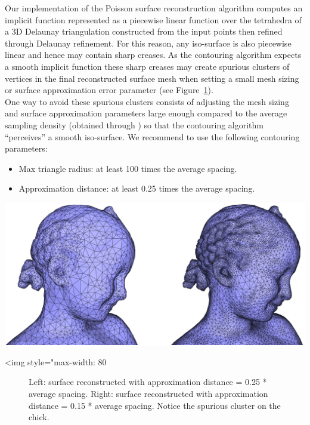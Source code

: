 Our implementation of the Poisson surface reconstruction algorithm computes an implicit function represented as a piecewise linear function over the tetrahedra of a 3D Delaunay triangulation constructed from the input points then refined through Delaunay refinement. For this reason, any iso-surface is also piecewise linear and hence may contain sharp creases. As the contouring algorithm  expects a smooth implicit function these sharp creases may create spurious clusters of vertices in the final reconstructed surface mesh when setting a small mesh sizing or surface approximation error parameter (see Figure~\ref{Surface_reconstruction_points_3-fig-contouring_bad}).\\
One way to avoid these spurious clusters consists of adjusting the mesh sizing and surface approximation parameters large enough compared to the average sampling density (obtained through ) so that the contouring algorithm ``perceives'' a smooth iso-surface. We recommend to use the following contouring parameters:
\begin{itemize}
\item Max triangle radius: at least 100 times the average spacing.
\item Approximation distance: at least 0.25 times the average spacing.
\end{itemize}

\begin{center}
    \begin{ccTexOnly}
        \includegraphics[width=1.0\textwidth]{Surface_reconstruction_points_3/contouring_bad}
    \end{ccTexOnly}
    \begin{ccHtmlOnly}
        <img style="max-width: 80%
    \end{ccHtmlOnly}
    \begin{figure}[h]
        \caption{Left: surface reconstructed with approximation
                 distance = 0.25 * average spacing.
                 Right: surface reconstructed with approximation
                 distance = 0.15 * average spacing.
                 Notice the spurious cluster on the chick.}
        \label{Surface_reconstruction_points_3-fig-contouring_bad}
    \end{figure}
\end{center}


